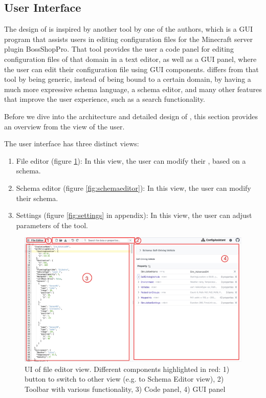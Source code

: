 

\subsection{User Interface}\label{subsec:overview}
The design of \toolname{} is inspired by another tool\cite{githubBspEditor} by one of the authors, which is a GUI program that assists users in editing configuration files for the Minecraft server plugin BossShopPro\cite{bossshoppro}.
That tool provides the user a code panel for editing configuration files of that domain in a text editor, as well as a GUI panel, where the user can edit their configuration file using GUI components.
\toolname{} differs from that tool by being generic, instead of being bound to a certain domain, by having a much more expressive schema language, a schema editor, and many other features that improve the user experience, such as a search functionality.

Before we dive into the architecture and detailed design of \toolname{}, this section provides an overview from the view of the user.

The user interface has three distinct views:
\begin{enumerate}
	\item File editor (figure \ref{fig:fileeditor}): In this view, the user can modify their \cfgfile{}, based on a schema.
	\item Schema editor (figure \ref{fig:schemaeditor}): In this view, the user can modify their schema.
	\item Settings (figure \ref{fig:settings} in appendix): In this view, the user can adjust parameters of the tool.
\end{enumerate}


\begin{figure}
    \includegraphics[width=\textwidth]{figures/fileeditor}
    \caption{UI of file editor view. Different components highlighted in red: 1) button to switch to other view (e.g. to Schema Editor view), 2) Toolbar with various functionality, 3) Code panel, 4) GUI panel}
    \label{fig:fileeditor}
\end{figure}

